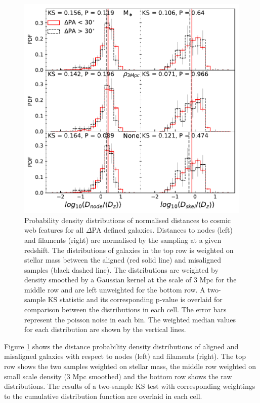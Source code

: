 \begin{figure}
    \centering
	\includegraphics[width=0.85\linewidth]{thesis/latex/halo_assembly_manga/PA_ALL_CW.pdf}
    \caption[Probability density distributions of normalised distances to cosmic web features for all $\Delta$PA defined galaxies.]{Probability density distributions of normalised distances to cosmic web features for all $\Delta$PA defined galaxies. Distances to nodes (left) and filaments (right) are normalised by the sampling at a given redshift. The distributions of galaxies in the top row is weighted on stellar mass between the aligned (red solid line) and misaligned samples (black dashed line). The distributions are weighted by density smoothed by a Gaussian kernel at the scale of 3 Mpc for the middle row and are left unweighted for the bottom row. A two-sample KS statistic and its corresponding p-value is overlaid for comparison between the distributions in each cell. The error bars represent the poisson noise in each bin. The weighted median values for each distribution are shown by the vertical lines.}
    \label{fig:cw_all}
\end{figure}

Figure \ref{fig:cw_all} shows the distance probability density distributions of aligned and misaligned galaxies with respect to nodes (left) and filaments (right). The top row shows the two samples weighted on stellar mass, the middle row weighted on small scale density (3 Mpc smoothed) and the bottom row shows the raw distributions. The results of a two-sample KS test with corresponding weightings to the cumulative distribution function are overlaid in each cell. 

